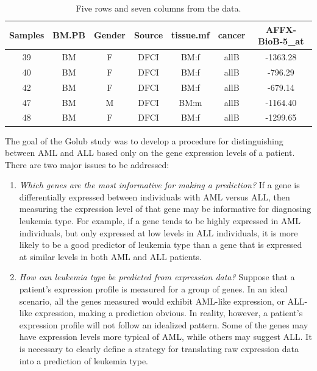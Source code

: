 
\begin{table}[ht]
	\centering
	\begin{tabular}{ccccccc}
		\hline
		Samples & BM.PB & Gender & Source & tissue.mf & cancer & AFFX-BioB-5\_at \\ 
		\hline
		  39 & BM & F & DFCI & BM:f & allB & -1363.28 \\ 
		  40 & BM & F & DFCI & BM:f & allB & -796.29 \\ 
		  42 & BM & F & DFCI & BM:f & allB & -679.14 \\ 
		  47 & BM & M & DFCI & BM:m & allB & -1164.40 \\ 
		  48 & BM & F & DFCI & BM:f & allB & -1299.65 \\ 
		\hline
	\end{tabular}
	\caption{Five rows and seven columns from the  data.} 
	\label{sampleGolubData}
\end{table}

The goal of the Golub study was to develop a procedure for distinguishing between AML and ALL based only on the gene expression levels of a patient. There are two major issues to be addressed:

\begin{enumerate}
	\item \textit{Which genes are the most informative for making a prediction?} If a gene is differentially expressed between individuals with AML versus ALL, then measuring the expression level of that gene may be informative for diagnosing leukemia type. For example, if a gene tends to be highly expressed in AML individuals, but only expressed at low levels in ALL individuals, it is more likely to be a good predictor of leukemia type than a gene that is expressed at similar levels in both AML and ALL patients.  
	
	\item \textit{How can leukemia type be predicted from expression data?} Suppose that a patient's expression profile is measured for a group of genes. In an ideal scenario, all the genes measured would exhibit AML-like expression, or ALL-like expression, making a prediction obvious. In reality, however, a patient's expression profile will not follow an idealized pattern. Some of the genes may have expression levels more typical of AML, while others may suggest ALL. It is necessary to clearly define a strategy for translating raw expression data into a prediction of leukemia type.
	
\end{enumerate}

